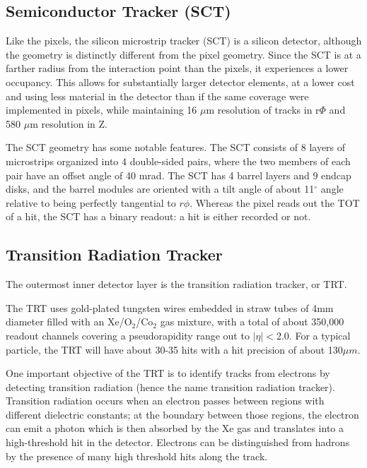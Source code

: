 \subsection{Semiconductor Tracker (SCT)}
\label{sec:sct}
Like the pixels, the silicon microstrip tracker (SCT) is a silicon detector, although the geometry is distinctly different from the pixel geometry.  Since the SCT is at a farther radius from the interaction point than the pixels, it experiences a lower occupancy.  This allows for substantially larger detector elements, at a lower cost and using less material in the detector than if the same coverage were implemented in pixels, while maintaining 16 $\mu$m resolution of tracks in r$\Phi$ and 580 $\mu$m resolution in Z.   

The SCT geometry has some notable features.  The SCT consists of 8 layers of microstrips organized into 4 double-sided pairs, where the two members of each pair have an offset angle of 40 mrad.  The SCT has 4 barrel layers and 9 endcap disks, and the barrel modules are oriented with a tilt angle of about 11$^\circ$ angle relative to being perfectly tangential to $r\phi$.  Whereas the pixel reads out the TOT of a hit, the SCT has a binary readout: a hit is either recorded or not.



\subsection{Transition Radiation Tracker}
\label{sec:trt}
The outermost inner detector layer is the transition radiation tracker, or TRT.  

The TRT uses gold-plated tungsten wires embedded in straw tubes of 4mm diameter filled with an Xe/O$_2$/Co$_2$ gas mixture, with a total of about 350,000 readout channels covering a pseudorapidity range out to $|\eta|<$2.0.  For a typical particle, the TRT will have about 30-35 hits with a hit precision of about 130$\mu m$.

One important objective of the TRT is to identify tracks from electrons by detecting transition radiation (hence the name transition radiation tracker).  Transition radiation occurs when an electron passes between regions with different dielectric constants; at the boundary between those regions, the electron can emit a photon which is then absorbed by the Xe gas and translates into a high-threshold hit in the detector.  Electrons can be distinguished from hadrons by the presence of many high threshold hits along the track.

